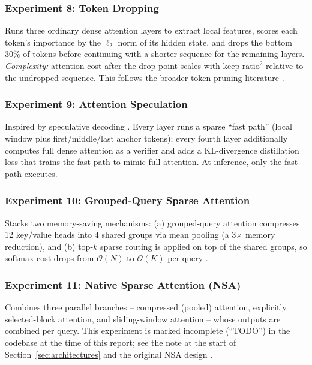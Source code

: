 \documentclass[11pt]{article}
\newcommand{\bigO}{\mathcal{O}}
\begin{document}
\subsubsection*{Experiment 8: Token Dropping}
\label{exp:token-drop}
Runs three ordinary dense attention layers to extract local features, scores
each token's importance by the $\ell_2$ norm of its hidden state, and drops
the bottom 30\% of tokens before continuing with a shorter sequence for the
remaining layers. \emph{Complexity:} attention cost after the drop point
scales with $\mathrm{keep\_ratio}^2$ relative to the undropped sequence. This
follows the broader token-pruning literature \citep{goyal2020powerbert,kim2021tokenpruning}.

\subsubsection*{Experiment 9: Attention Speculation}
\label{exp:speculation}
Inspired by speculative decoding \citep{leviathan2023speculative}. Every layer runs a sparse ``fast path''
(local window plus first/middle/last anchor tokens); every fourth layer
additionally computes full dense attention as a verifier and adds a
KL-divergence distillation loss that trains the fast path to mimic full
attention. At inference, only the fast path executes.

\subsubsection*{Experiment 10: Grouped-Query Sparse Attention}
\label{exp:gqa}
Stacks two memory-saving mechanisms: (a) grouped-query attention compresses
12 key/value heads into 4 shared groups via mean pooling (a 3$\times$ memory
reduction), and (b) top-$k$ sparse routing is applied on top of the shared
groups, so softmax cost drops from $\bigO(N)$ to $\bigO(K)$ per query
\citep{ainslie2023gqa}.

\subsubsection*{Experiment 11: Native Sparse Attention (NSA)}
\label{exp:nsa}
Combines three parallel branches -- compressed (pooled) attention, explicitly
selected-block attention, and sliding-window attention -- whose outputs are
combined per query. This experiment is marked incomplete (``TODO'') in the
codebase at the time of this report; see the note at the start of
Section~\ref{sec:architectures} and the original NSA design
\citep{yuan2025nsa}.
\end{document}
